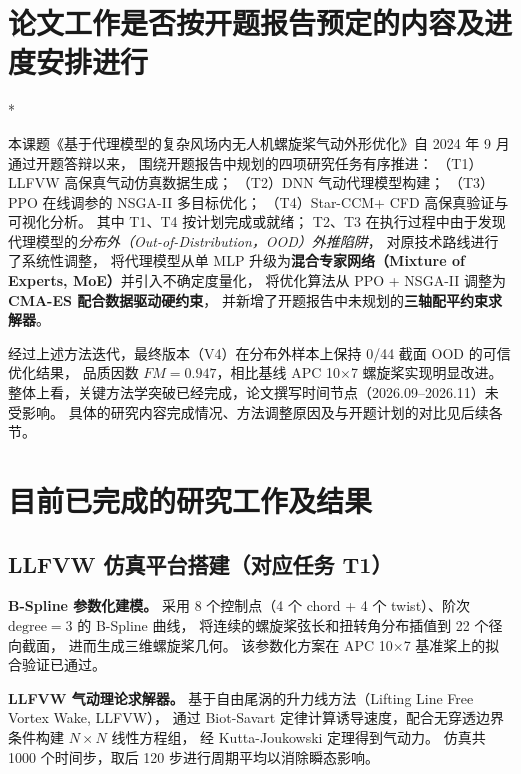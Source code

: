
\section{论文工作是否按开题报告预定的内容及进度安排进行}*

本课题《基于代理模型的复杂风场内无人机螺旋桨气动外形优化》自 2024 年 9 月通过开题答辩以来，
围绕开题报告中规划的四项研究任务有序推进：
（T1）LLFVW 高保真气动仿真数据生成；
（T2）DNN 气动代理模型构建；
（T3）PPO 在线调参的 NSGA-II 多目标优化；
（T4）Star-CCM+ CFD 高保真验证与可视化分析。
其中 T1、T4 按计划完成或就绪；
T2、T3 在执行过程中由于发现代理模型的\emph{分布外（Out-of-Distribution，OOD）外推陷阱}，
对原技术路线进行了系统性调整，
将代理模型从单 MLP 升级为\textbf{混合专家网络（Mixture of Experts, MoE）}并引入不确定度量化，
将优化算法从 PPO + NSGA-II 调整为\textbf{CMA-ES 配合数据驱动硬约束}，
并新增了开题报告中未规划的\textbf{三轴配平约束求解器}。

经过上述方法迭代，最终版本（V4）在分布外样本上保持 0/44 截面 OOD 的可信优化结果，
品质因数 $FM=0.947$，相比基线 APC 10$\times$7 螺旋桨实现明显改进。
整体上看，关键方法学突破已经完成，论文撰写时间节点（2026.09--2026.11）未受影响。
具体的研究内容完成情况、方法调整原因及与开题计划的对比见后续各节。

\section{目前已完成的研究工作及结果}

\subsection{LLFVW 仿真平台搭建（对应任务 T1）}

\textbf{B-Spline 参数化建模。}
采用 8 个控制点（4 个 chord + 4 个 twist）、阶次 $\text{degree}=3$ 的 B-Spline 曲线，
将连续的螺旋桨弦长和扭转角分布插值到 22 个径向截面，
进而生成三维螺旋桨几何。
该参数化方案在 APC 10$\times$7 基准桨上的拟合验证已通过。

\textbf{LLFVW 气动理论求解器。}
基于自由尾涡的升力线方法（Lifting Line Free Vortex Wake, LLFVW），
通过 Biot-Savart 定律计算诱导速度，配合无穿透边界条件构建 $N \times N$ 线性方程组，
经 Kutta-Joukowski 定理得到气动力。
仿真共 1000 个时间步，取后 120 步进行周期平均以消除瞬态影响。

